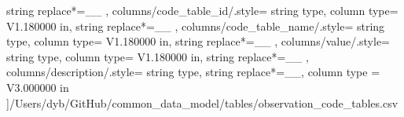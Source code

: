 \begin{landscape}
{            string replace*={_}{\_}
        },
    columns/code_table_id/.style={
            string type, 
            column type= V{1.180000 in}, 
            string replace*={_}{\_}
        },
    columns/code_table_name/.style={
            string type, 
            column type= V{1.180000 in}, 
            string replace*={_}{\_}
        },
    columns/value/.style={
            string type, 
            column type= V{1.180000 in}, 
            string replace*={_}{\_}
        },
    columns/description/.style={
            string type, 
            string replace*={_}{\_},
            column type = V{3.000000 in}
        }
    ]{/Users/dyb/GitHub/common_data_model/tables/observation_code_tables.csv}
\end{landscape}

